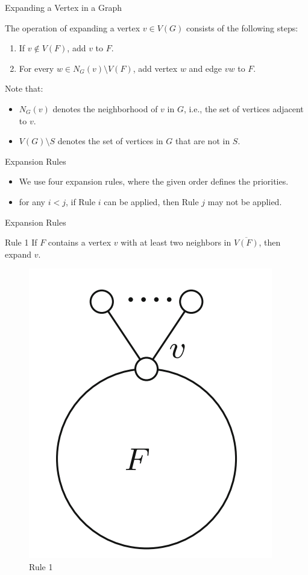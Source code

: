 \documentclass{beamer}
\begin{document}
\begin{frame}{Expanding a Vertex in a Graph}
\bigskip

The operation of expanding a vertex $v \in V(G)$ consists of the following steps:

\begin{enumerate}
    \item If $v \notin V(F)$, add $v$ to $F$.
    \item For every $w \in N_G(v) \setminus V(F)$, add vertex $w$ and edge $vw$ to $F$.
\end{enumerate}

\bigskip

Note that:
\begin{itemize}
    \item $N_G(v)$ denotes the neighborhood of $v$ in $G$, i.e., the set of vertices adjacent to $v$.
    \item $V(G) \setminus S$ denotes the set of vertices in $G$ that are not in $S$.
\end{itemize}
\end{frame}



\begin{frame}{Expansion Rules}
\begin{itemize}
    \item We use four expansion rules, where the given order defines the priorities. 
    \item for any $i < j$, if Rule $i$ can be applied, then Rule $j$ may not be applied.
\end{itemize}

\end{frame}

\begin{frame}{Expansion Rules}
\begin{exampleblock}{Rule 1}
 If $F$ contains a vertex $v$ with at least two neighbors in $\overline{V(F)}$, then expand $v$.
\end{exampleblock}
\begin{figure}
    \centering
    \includegraphics[height=0.3\textwidth]{rule1.png}
    \caption{Rule 1}
\end{figure}
\end{frame}
\end{document}
